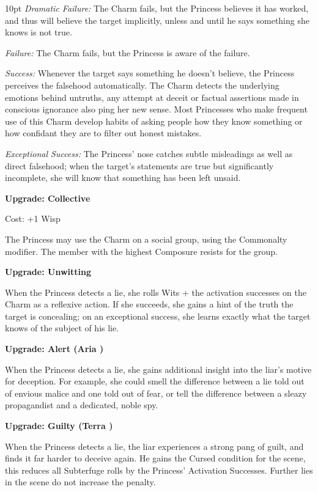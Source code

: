 \begin{myindentpar}{10pt}    \emph{Dramatic Failure:} The Charm fails, but the Princess believes it has worked, and thus will believe the target implicitly, unless and until he says something she knows is not true.

    \emph{Failure:} The Charm fails, but the Princess is aware of the failure.

    \emph{Success:} Whenever the target says something he doesn't believe, the Princess perceives the falsehood automatically. The Charm detects the underlying emotions behind untruths, any attempt at deceit or factual assertions made in conscious ignorance also ping her new sense. Most Princesses who make frequent use of this Charm develop habits of asking people how they know something or how confidant they are to filter out honest mistakes. 

    \emph{Exceptional Success:} The Princess' nose catches subtle misleadings as well as direct falsehood; when the target's statements are true but significantly incomplete, she will know that something has been left unsaid.

\textbf{Upgrade: Collective}

\noindent Cost: +1 Wisp

The Princess may use the Charm on a social group, using the Commonalty modifier. The member with the highest Composure resists for the group.

\textbf{Upgrade: Unwitting}

When the Princess detects a lie, she rolls Wits + the activation successes on the Charm as a reflexive action. If she succeeds, she gains a hint of the truth the target is concealing; on an exceptional success, she learns exactly what the target knows of the subject of his lie.

\textbf{Upgrade: Alert (Aria \textbullet)}

When the Princess detects a lie, she gains additional insight into the liar's motive for deception. For example, she could smell the difference between a lie told out of envious malice and one told out of fear, or tell the difference between a sleazy propagandist and a dedicated, noble spy.

\textbf{Upgrade: Guilty (Terra \textbullet)}

When the Princess detects a lie, the liar experiences a strong pang of guilt, and finds it far harder to deceive again. He gains the Cursed condition for the scene, this reduces all Subterfuge rolls by the Princess' Activation Successes. Further lies in the scene do not increase the penalty.


\end{myindentpar}
